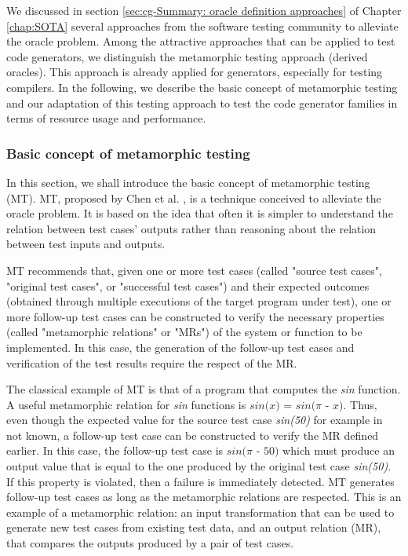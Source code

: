 We discussed in section \ref{sec:cg-Summary: oracle definition approaches} of Chapter \ref{chap:SOTA} several approaches from the software testing community to alleviate the oracle problem. Among the attractive approaches that can be applied to test code generators, we distinguish the metamorphic testing approach (derived oracles). This approach is already applied for generators, especially for testing compilers\cite{donaldson2016metamorphic,tao2010automatic,le2014compiler}. In the following, we describe the basic concept of metamorphic testing and our adaptation of this testing approach to test the code generator families in terms of resource usage and performance.

\subsubsection{Basic concept of metamorphic testing}
In this section, we shall introduce the basic concept of metamorphic testing (MT). 
MT, proposed by Chen et al. \cite{chen1998metamorphic}, is a technique conceived to alleviate the oracle problem. It is based on the idea that often it is simpler to understand the relation between test cases' outputs rather than reasoning about the relation between test inputs and outputs. 

MT recommends that, given one or more test cases (called "source test cases", "original test cases", or "successful test cases") and their expected outcomes (obtained through multiple executions of the target program under test), one or more follow-up test cases can be constructed to verify the necessary properties (called "metamorphic relations" or "MRs") of the system or function to be implemented. In this case, the generation of the follow-up test cases and verification of the test results require the respect of the MR.

The classical example of MT is that of a program that computes the \textit{sin} function. A useful metamorphic relation for \textit{sin} functions is $\textit{sin(x) = sin($\pi$ - x)}$. Thus, even though the expected value for the source test case \textit{sin(50)} for example in not known, a follow-up test case can be constructed to verify the MR defined earlier. In this case, the follow-up test case is $\textit{sin($\pi$ - 50)}$ which must produce an output value that is equal to the one produced by the original test case \textit{sin(50)}. If this property is violated, then a failure is immediately detected.
MT generates follow-up test cases as long as the metamorphic relations are respected.
This is an example of a metamorphic relation: an input transformation that can be used to generate new test cases from existing test data, and an output relation (MR), that compares the outputs produced by a pair of test cases.

